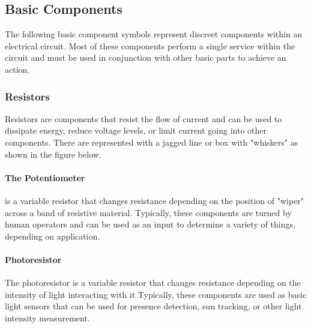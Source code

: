 

    \subsection{Basic Components} 
    The following basic component symbols represent discreet components within an electrical circuit.
    Most of these components perform a single service within the circuit and must be used in conjunction with other basic parts to achieve an action.

        \subsubsection*{Resistors} 
        Resistors are components that resist the flow of current and can be used to dissipate energy, reduce voltage levels, or limit current going into other components.
        There are represented with a jagged line or box with "whiskers"  as shown in the figure below.


        \paragraph*{The Potentiometer} is a variable resistor that changes resistance depending on the position of "wiper" across a band of resistive material.
        Typically, these components are turned by human operators and can be used as an input to determine a variety of things, depending on application.


        \paragraph*{Photoresistor}
        The photoresistor is a variable resistor that changes resistance depending on the intensity of light interacting with it
        Typically, these components are used as basic light sensors that can be used for presence detection, sun tracking, or other light intensity measurement.


    